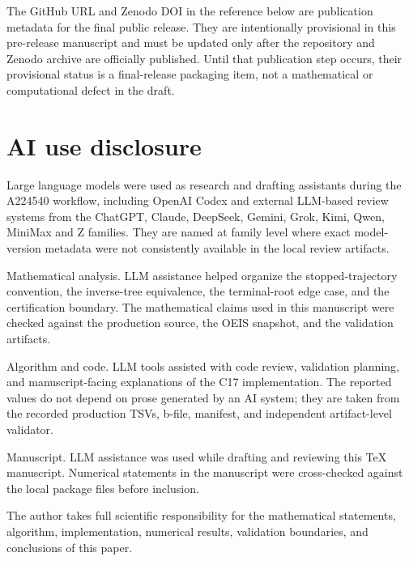 \documentclass[11pt]{article}
\theoremstyle{definition}
\theoremstyle{remark}
\begin{document}
The GitHub URL and Zenodo DOI in the reference below are publication metadata
for the final public release.  They are intentionally provisional in this
pre-release manuscript and must be updated only after the repository and
Zenodo archive are officially published.  Until that publication step occurs,
their provisional status is a final-release packaging item, not a mathematical
or computational defect in the draft.

\section*{AI use disclosure}

Large language models were used as research and drafting assistants during the
A224540 workflow, including OpenAI Codex and external LLM-based review systems
from the ChatGPT, Claude, DeepSeek, Gemini, Grok, Kimi, Qwen, MiniMax and Z
families.  They are named at family level where exact model-version metadata
were not consistently available in the local review artifacts.

Mathematical analysis.  LLM assistance helped organize the stopped-trajectory
convention, the inverse-tree equivalence, the terminal-root edge case, and the
certification boundary.  The mathematical claims used in this manuscript were
checked against the production source, the OEIS snapshot, and the validation
artifacts.

Algorithm and code.  LLM tools assisted with code review, validation planning,
and manuscript-facing explanations of the C17 implementation.  The reported
values do not depend on prose generated by an AI system; they are taken from
the recorded production TSVs, b-file, manifest, and independent artifact-level
validator.

Manuscript.  LLM assistance was used while drafting and reviewing this TeX
manuscript.  Numerical statements in the manuscript were cross-checked against
the local package files before inclusion.

The author takes full scientific responsibility for the mathematical
statements, algorithm, implementation, numerical results, validation
boundaries, and conclusions of this paper.
\end{document}
